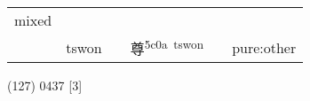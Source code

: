 \documentclass[14pt,a4paper]{scrartcl}
\begin{document}
\begin{longtable}[c]{@{}llllll@{}}
\begin{minipage}[t]{0.14\columnwidth}\raggedright\strut
mixed
\strut\end{minipage}\tabularnewline
\begin{minipage}[t]{0.14\columnwidth}\raggedright\strut
𢍜
\strut\end{minipage} &
\begin{minipage}[t]{0.14\columnwidth}\raggedright\strut
tswon
\strut\end{minipage} &
\begin{minipage}[t]{0.14\columnwidth}\raggedright\strut
\strut\end{minipage} &
\begin{minipage}[t]{0.14\columnwidth}\raggedright\strut
尊\textsuperscript{5c0a~tswon}
\strut\end{minipage} &
\begin{minipage}[t]{0.14\columnwidth}\raggedright\strut
\strut\end{minipage} &
\begin{minipage}[t]{0.14\columnwidth}\raggedright\strut
pure:other
\strut\end{minipage}\tabularnewline
\bottomrule
\end{longtable}

(127) 0437 {[}3{]}
\end{document}
